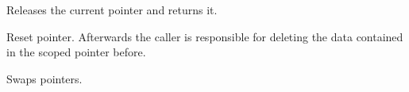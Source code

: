 \label{wxscopedptrtemplaterelease}


Releases the current pointer and returns it.

\label{wxscopedptrtemplatereset}


Reset pointer. Afterwards the caller is responsible for deleting
the data contained in the scoped pointer before.

\label{wxscopedptrtemplateswap}


Swaps pointers.

